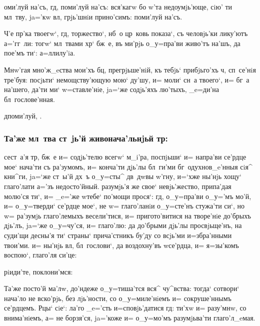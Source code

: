 \documentclass[12pt,a6paper,twoside,dvips,civil=antiqua,cs=izhitsa]{hipbook}
\begin{document}
оми'луй на'съ, гд, поми'луй на'съ: вся'кагw бо w'та
недоумjь'юще, сiю' ти мл~тву, ja='кw вл, грjь'шнiи прино'симъ:
поми'луй на'съ.

 Ч'е пр'ка твоегw`, гд, торжество`,
нб~о цр~ковь показа`, съ человjь'ки лику'ютъ а='гг~ли: тогw`
мл~твами хр` бж~е, въ ми'рjь о_у=пра'ви живо'тъ на'шъ, да пое'мъ
ти`: а=ллилу'iа.

 Мнw'гая мно'ж_eства мои'хъ бц,
прегрjьше'нiй, къ тебjь` прибjьго'хъ ч, сп~се'нiя тре'буя:
посjьти` немощству'ющую мою` ду'шу, и= моли` сн~а твоего`,
и= бг~а на'шего, да'ти ми` w=ставле'нiе, ja=`же содjь'яхъ
лю'тыхъ, _e=ди'на бл~гослове'нная.

\baselineskip
\centerline{д поми'луй, .}
\baselineskip

\centerline{}

\subsubsection{Та'же мл~тва ст~jь'й живонача'льнjьй тр:}

сест~а'я тр, бж~е и= содjь'телю всегw` м_i'ра, поспjьши`
и= напра'ви се'рдце мое` нача'ти съ ра'зумомъ, и= конча'ти дjь'лы
бл~ги'ми бг~одухнов_e'нныя сiя^ кни^ги, ja=`же ст~ы'й дх~ъ
о_у=сты^ дв~дwвы w'гну, и=`хже ны'нjь хощу` глаго'лати
а='зъ недосто'йный. разумjь'я же свое` невjь'жество, припа'дая молю'ся
ти`, и= _e='же w\т тебе` по'мощи прося`: гд, о_у=пра'ви о_у='мъ
мо'й, и= о_у=тверди` се'рдце мое`, не w= глаго'ланiи о_у=сте'нъ
стужа'ти си`, но w= ра'зумjь глаго'лемыхъ весели'тися, и=
пригото'витися на творе'нiе до'брыхъ дjь'лъ, ja=`же
о_у=чу'ся, и= глаго'лю: да до'брыми дjь'лы просвjьще'нъ, на суди'щи
десны'я ти` страны` прича'стникъ бу'ду со всjь'ми и=збра'нными
твои'ми. и= ны'нjь вл, бл~гослови`, да воздохну'въ w\т се'рдца, и=
я=зы'комъ воспою`, глаго'ля си'це:

\begin{center}
  рiиди'те, поклони'мся: 
\end{center}

{\small \color[named]{Red} Та'же посто'й ма'лw, до'ндеже о_у=тиша'тся
  вся^ чу^вства: тогда` сотвори` нача'ло не вско'рjь, без\ъ
  лjь'ности, со о_у=миле'нiемъ и= сокруше'ннымъ се'рдцемъ. Рцы` сiе`:
  {\color[named]{Black} ла'го _e='сть и=сповjь'датися
    гд:} ти'хw и= разу'мнw, со внима'нiемъ, а= не борзя'ся,
  ja='коже и= о_у=мо'мъ разумjьва'ти глаго'л_eмая.}
\end{document}
